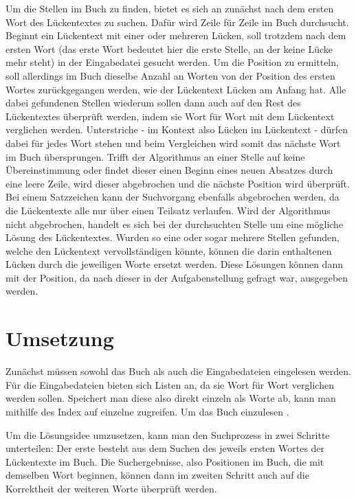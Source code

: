 \documentclass[a4paper,10pt,ngerman]{scrartcl}
\begin{document}
		Um die Stellen im Buch zu finden, bietet es sich an zunächst nach dem ersten Wort des Lückentextes zu suchen.
		Dafür wird Zeile für Zeile im Buch durchsucht.
		Beginnt ein Lückentext mit einer oder mehreren Lücken, soll trotzdem nach dem ersten Wort (das erste Wort bedeutet hier die erste Stelle, an der keine Lücke mehr steht) in der Eingabedatei gesucht werden.
		Um die Position zu ermitteln, soll allerdings im Buch dieselbe Anzahl an Worten von der Position des ersten Wortes zurückgegangen werden, wie der Lückentext Lücken am Anfang hat.
		Alle dabei gefundenen Stellen wiederum sollen dann auch auf den Rest des Lückentextes überprüft werden, indem sie Wort für Wort mit dem Lückentext verglichen werden.
		Unterstriche - im Kontext also Lücken im Lückentext - dürfen dabei für jedes Wort stehen und beim Vergleichen wird somit das nächste Wort im Buch übersprungen.
		Trifft der Algorithmus an einer Stelle auf keine Übereinstimmung oder findet dieser einen Beginn eines neuen Absatzes durch eine leere Zeile, wird dieser abgebrochen und die nächste Position wird überprüft.
		Bei einem Satzzeichen kann der Suchvorgang ebenfalls abgebrochen werden, da die Lückentexte alle nur über einen Teilsatz verlaufen.
		Wird der Algorithmus nicht abgebrochen, handelt es sich bei der durchsuchten Stelle um eine mögliche Lösung des Lückentextes.
		Wurden so eine oder sogar mehrere Stellen gefunden, welche den Lückentext vervollständigen könnte, können die darin enthaltenen Lücken durch die jeweiligen Worte ersetzt werden.
		Diese Lösungen können dann mit der Position, da nach dieser in der Aufgabenstellung gefragt war, ausgegeben werden.

	\section{Umsetzung}\label{sec:umsetzung}
		Zunächst müssen sowohl das Buch als auch die Eingabedateien eingelesen werden.
		Für die Eingabedateien bieten sich Listen an, da sie Wort für Wort verglichen werden sollen.
		Speichert man diese also direkt einzeln als Worte ab, kann man mithilfe des Index auf einzelne zugreifen.
		Um das Buch einzulesen .

		Um die Lösungsidee umzusetzen, kann man den Suchprozess in zwei Schritte unterteilen:
		Der erste besteht aus dem Suchen des jeweils ersten Wortes der Lückentexte im Buch.
		Die Suchergebnisse, also Positionen im Buch, die mit demselben Wort beginnen, können dann im zweiten Schritt auch auf die Korrektheit der weiteren Worte überprüft werden.
\end{document}
